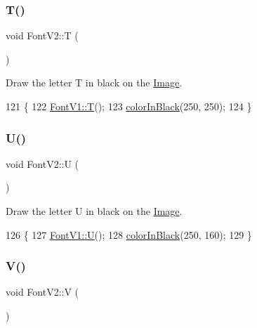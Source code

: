 \subsubsection{\texorpdfstring{T()}{T()}}
{\footnotesize\ttfamily void Font\+V2\+::T (\begin{DoxyParamCaption}{ }\end{DoxyParamCaption})}



Draw the letter T in black on the \mbox{\hyperlink{class_image}{Image}}. 


\begin{DoxyCode}
121                \{
122     \mbox{\hyperlink{class_font_v1_ab520e2522e89b6ff20e42621080edd7d}{FontV1::T}}();
123     \mbox{\hyperlink{class_font_v2_a04f2501961bc286ce70fbb6a840b0e8a}{colorInBlack}}(250, 250);
124 \}
\end{DoxyCode}
\mbox{\label{class_font_v2_a893e649c0fccfae9d99322fe5e333369}} 
\subsubsection{\texorpdfstring{U()}{U()}}
{\footnotesize\ttfamily void Font\+V2\+::U (\begin{DoxyParamCaption}{ }\end{DoxyParamCaption})}



Draw the letter U in black on the \mbox{\hyperlink{class_image}{Image}}. 


\begin{DoxyCode}
126                \{
127     \mbox{\hyperlink{class_font_v1_a460d625b76b123ba4e67a21091d7dcce}{FontV1::U}}();
128     \mbox{\hyperlink{class_font_v2_a04f2501961bc286ce70fbb6a840b0e8a}{colorInBlack}}(250, 160);
129 \}
\end{DoxyCode}
\mbox{\label{class_font_v2_a58980cf432ef60e1a765b1033da310b4}} 
\subsubsection{\texorpdfstring{V()}{V()}}
{\footnotesize\ttfamily void Font\+V2\+::V (\begin{DoxyParamCaption}{ }\end{DoxyParamCaption})}



